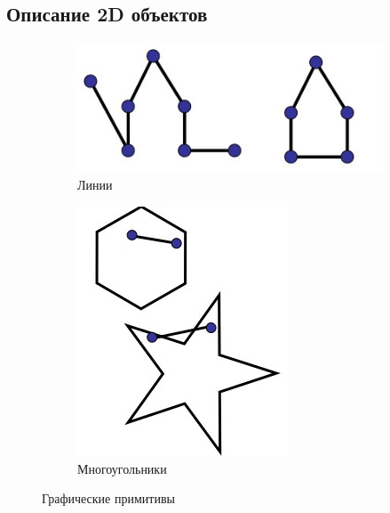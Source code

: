 \documentclass[a4paper, 14pt]{extarticle}
\begin{document}
\subsection{Описание 2D объектов}
\begin{figure}[h]
	\centering
	\begin{subfigure}[b]{0.65\textwidth}
		\centering
		\includegraphics[width=\textwidth]{l3/S001.jpg}
		\caption{Линии}
	\end{subfigure}
	\begin{subfigure}[b]{0.3\textwidth}
		\centering
		\includegraphics[width=\textwidth]{l3/S002.jpg}
		\caption{Многоугольники}
	\end{subfigure}
	\caption{Графические примитивы}
\end{figure}
\end{document}
